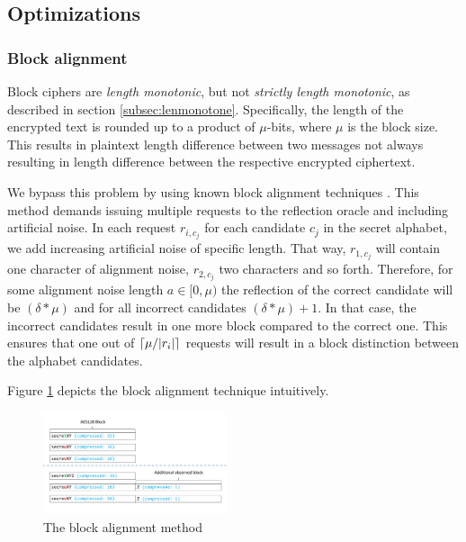 \subsection{Optimizations}\label{subsec:optimizations}

\subsubsection{Block alignment}\label{subsec:blockalign}
Block ciphers are \textit{length monotonic}, but not \textit{strictly length
monotonic}, as described in section \ref{subsec:lenmonotone}. Specifically, the
length of the encrypted text is rounded up to a product of $\mu$-bits, where
$\mu$ is the block size. This results in plaintext length difference between two
messages not always resulting in length difference between the respective
encrypted ciphertext.

We bypass this problem by using known block alignment techniques
\cite{moller2014poodle}. This method demands issuing multiple requests to the
reflection oracle and including artificial noise. In each request $r_{i, c_j}$
for each candidate $c_j$ in the secret alphabet, we add increasing artificial
noise of specific length. That way, $r_{1, c_j}$ will contain one character
of alignment noise, $r_{2, c_j}$ two characters and so forth. Therefore, for
some alignment noise length $a \in [0, \mu)$ the reflection of the correct
candidate will be $(\delta*\mu)$ and for all incorrect candidates
$(\delta*\mu)+1$. In that case, the incorrect candidates result in one more
block compared to the correct one. This ensures that one out of $\lceil\mu /
|r_i|\rceil$ requests will result in a block distinction between the alphabet
candidates.

Figure \ref{fig:block_alignment} depicts the block alignment technique
intuitively.

   \begin{figure}[thpb]
      \centering
          \includegraphics[width=0.48\textwidth]{figures/block_alignment.png}
      \caption{The block alignment method}
      \label{fig:block_alignment}
   \end{figure}


